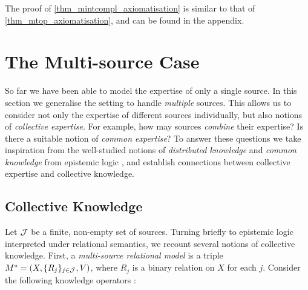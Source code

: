 The proof of \cref{thm_mintcompl_axiomatisation} is similar to that of
\cref{thm_mtop_axiomatisation}, and can be found in the appendix.

\section{The Multi-source Case}
\label{sec_multisource}

So far we have been able to model the expertise of only a single
source. In this section we generalise the setting to handle \emph{multiple}
sources. This allows us to consider not only the expertise of different
sources individually, but also notions of \emph{collective expertise}. For
example, how may sources \emph{combine} their expertise? Is there a suitable
notion of
\emph{common expertise}? To answer these questions we take inspiration from the
well-studied notions of \emph{distributed knowledge} and \emph{common
knowledge} from epistemic logic \citep{fagin2003reasoning}, and
establish connections between collective expertise and collective knowledge.

\subsection{Collective Knowledge}

Let $\mathcal{J}$ be a finite, non-empty set of sources. Turning briefly to epistemic
logic interpreted under relational semantics, we recount several notions of
collective knowledge. First, a \emph{multi-source relational model} is a triple
$M^* = (X, \{R_j\}_{j \in \mathcal{J}}, V)$, where $R_j$ is a binary relation on $X$ for
each $j$. Consider the following knowledge operators \citep{fagin2003reasoning}:

